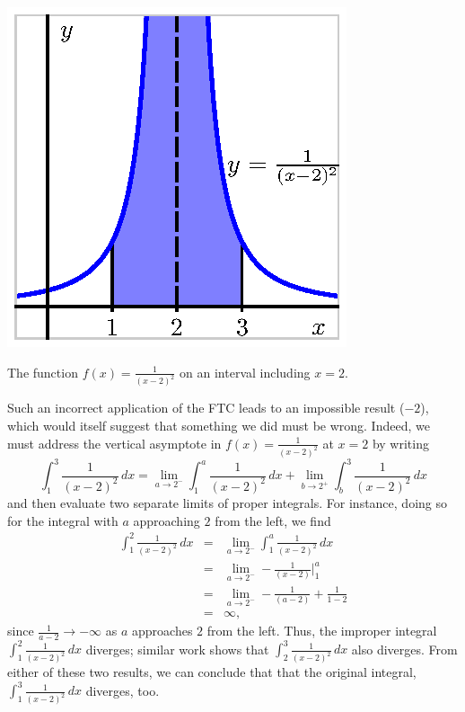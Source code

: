 \begin{marginfigure} %
\includegraphics{figures/6_5_InfIntegrand2.eps}
\caption{The function $f(x) = \frac{1}{(x-2)^2}$ on an interval including $x = 2$.} \label{F:5.5.InfIntegrand2}
\end{marginfigure}

Such an incorrect application of the FTC leads to an impossible result ($-2$), which would itself suggest that something we did must be wrong.  Indeed, we must address the vertical asymptote in $f(x) = \frac{1}{(x-2)^2}$ at $x = 2$ by writing
$$\int_1^3 \frac{1}{(x-2)^2} \, dx = \lim_{a \to 2^-} \int_1^a \frac{1}{(x-2)^2} \, dx + \lim_{b \to 2^+} \int_b^3 \frac{1}{(x-2)^2} \, dx$$
and then evaluate two separate limits of proper integrals.  For instance, doing so for the integral with $a$ approaching $2$ from the left, we find 
\begin{eqnarray*}
\int_1^2 \frac{1}{(x-2)^2} \, dx & = & \lim_{a \to 2^-} \int_1^a \frac{1}{(x-2)^2} \, dx \\
						& = & \lim_{a \to 2^-} -\frac{1}{(x-2)} \bigg\vert_1^a \\
						& = & \lim_{a \to 2^-} -\frac{1}{(a-2)} + \frac{1}{1-2} \\
						& = & \infty,
\end{eqnarray*}
since $\frac{1}{a-2} \to -\infty$ as $a$ approaches $2$ from the left.  Thus, the improper integral $\int_1^2 \frac{1}{(x-2)^2} \, dx$ diverges; similar work shows that $\int_2^3 \frac{1}{(x-2)^2} \, dx$ also diverges.  From either of these two results, we can conclude that  that the original integral, $\int_1^3 \frac{1}{(x-2)^2} \, dx$ diverges, too.  

